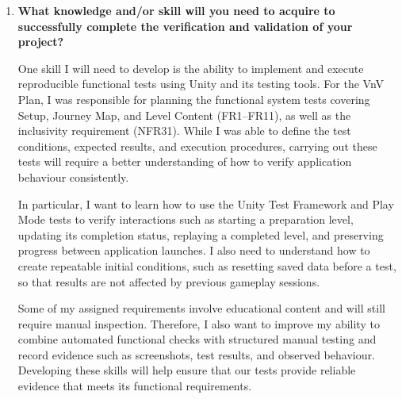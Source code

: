 \documentclass[10pt,titlepage]{article}
\begin{document}
\begin{enumerate}
    To address these issues, we discussed our concerns with
    our TA, Rashad, who recommended that we communicate our
    situation and questions to the course staff for further
    guidance. We also began reconsidering our planned Custom
    Documents, identifying a Cognitive Walkthrough Report or
    Wireframe Report as possible alternatives for the Fall
    semester. For the VnV Plan, we adjusted our proposed
    validation activities to focus on internal reviews,
    peer evaluations using child and caregiver personas,
    and feedback from our supervisor where feasible.

    Although these changes allowed us to continue planning
    the deliverable, some uncertainty remains regarding
    the final selection of our Custom Documents and the
    validation activities we can realistically perform.
    This experience highlighted the importance of
    establishing clear expectations with supervisors
    early in the project and communicating potential
    constraints before they affect planned deliverables.


    \item \textbf{What knowledge and/or skill will you need to acquire
    to successfully complete the verification and validation of
    your project?}

    One skill I will need to develop is the ability to implement
    and execute reproducible functional tests using Unity and
    its testing tools. For the VnV Plan, I was responsible for
    planning the functional system tests covering Setup,
    Journey Map, and Level Content (FR1--FR11), as well as
    the inclusivity requirement (NFR31). While I was able
    to define the test conditions, expected results, and
    execution procedures, carrying out these tests will
    require a better understanding of how to verify
    application behaviour consistently.

    In particular, I want to learn how to use the Unity
    Test Framework and Play Mode tests to verify interactions
    such as starting a preparation level, updating its
    completion status, replaying a completed level, and
    preserving progress between application launches.
    I also need to understand how to create repeatable
    initial conditions, such as resetting saved data
    before a test, so that results are not affected by
    previous gameplay sessions.

    Some of my assigned requirements involve educational
    content and will still require manual inspection.
    Therefore, I also want to improve my ability to
    combine automated functional checks with structured
    manual testing and record evidence such as screenshots,
    test results, and observed behaviour. Developing these
    skills will help ensure that our tests provide reliable
    evidence that \progname{} meets its functional requirements.



\end{enumerate}
\end{document}
